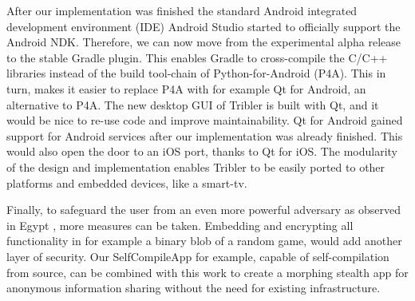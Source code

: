 
After our implementation was finished the standard Android integrated development environment (IDE) Android Studio started to officially support the Android NDK.
Therefore, we can now move from the experimental alpha release to the stable Gradle plugin.
This enables Gradle to cross-compile the C/C++ libraries instead of the build tool-chain of Python-for-Android (P4A).
This in turn, makes it easier to replace P4A with for example Qt for Android, an alternative to P4A.
The new desktop GUI of Tribler is built with Qt, and it would be nice to re-use code and improve maintainability.
Qt for Android gained support for Android services after our implementation was already finished.
This would also open the door to an iOS port, thanks to Qt for iOS.
The modularity of the design and implementation enables Tribler to be easily ported to other platforms and embedded devices, like a smart-tv.

Finally, to safeguard the user from an even more powerful adversary as observed in Egypt \cite{egypt_show_your_facebook_airport}, more measures can be taken.
Embedding and encrypting all functionality in for example a binary blob of a random game, would add another layer of security.
Our SelfCompileApp for example, capable of self-compilation from source, can be combined with this work to create a morphing stealth app for anonymous information sharing without the need for existing infrastructure.

